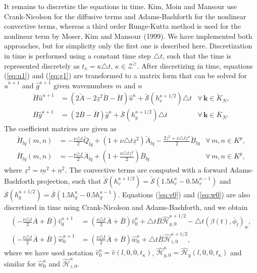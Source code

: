 \documentclass[11pt, oneside]{elsarticle}
\newcommand{\N}[1]{\check{#1}}
\newcommand{\D}[1]{\overline{#1}}
\begin{document}
It remains to discretize the equations in time. Kim, Moin and Mansour use 
Crank-Nicolson for the diffusive terms and Adams-Bashforth for the nonlinear 
convective terms, whereas a third order Runge-Kutta method is used for the 
nonlinear term by Moser, Kim and Mansour (1999). We have implemented both 
approaches, but for simplicity only the first one is described here. 
Discretization in time is performed using a constant time step $\triangle t$, 
such that the time is represented discretely as $t_{\kappa} = {\kappa} \triangle t, \, {\kappa} \in 
\mathcal{Z}^{\ge}$. After 
discretizing in time, equations (\ref{eq:u1}) and (\ref{eq:g1}) are transformed 
to a matrix form that can be solved for $\hat{u}^{{\kappa}+1}$ and $\hat{g}^{{\kappa}+1}$ 
given wavenumbers $m$ and $n$
\begin{align}
\N{H}\hat{u}^{{\kappa}+1} & = \left(2\N{A} - 2\underline{z}^2\N{B} - \N{H} 
\right)\hat{u}^{{\kappa}} + \N{\mathcal{S}}(h_v^{{\kappa}+1/2}) \triangle t & 
\forall \, {\bm{k}} \in \N{K}_N, 
\label{eq:ufin}\\ 
\D{H} \hat{g}^{{\kappa}+1} &= \left(2 \D{B}-\D{H}\right) 
\hat{g}^{{\kappa}} + \D{\mathcal{S}}(h_g^{{\kappa}+1/2}) \triangle t &\forall \, 
{\bm{k}} \in 
\D{K}_N. \label{eq:gfin}
\end{align}
The coefficient matrices are given as
\begin{align}
\N{H}_{lq}(m, n) &= -\frac{\nu \triangle t}{2}\N{Q}_{lq} + \left( 1 + \nu 
\triangle t 
\underline{z}^2 \right) \N{A}_{lq} - \frac{2\underline{z}^2 + \nu \triangle t 
\underline{z}^4}{2} \N{B}_{lq} &\forall \, m, n \in K^p, 
\label{eq:Biharmonic_matrix} \\
\D{H}_{lq}(m, n) &= -\frac{\nu \triangle 
t}{2}\D{A}_{lq} + (1 + \frac{\nu \triangle t \underline{z}^2}{2}) \D{B}_{lq} 
&\forall \, m, n \in K^p, \label{eq:Helmholtz_matrix}
\end{align}
where $\underline{z}^2 = \underline{m}^2 + \underline{n}^2$. The convective 
terms are computed with a forward Adams-Bashforth projection, such that 
$\N{\mathcal{S}}(h_v^{{\kappa}+1/2}) = 
\N{\mathcal{S}}(1.5h_v^{{\kappa}} - 0.5 h_v^{{\kappa}-1})$ and $\D{\mathcal{S}}(h_g^{{\kappa}+1/2}) 
= \D{\mathcal{S}}(1.5h_g^{{\kappa}} - 0.5 h_g^{{\kappa}-1})$. Equations 
(\ref{eq:v0}) and (\ref{eq:w0}) are also discretized in time using 
Crank-Nicolson and Adams-Bashforth, and we obtain
\begin{align}
\left(-\frac{\nu \triangle t}{2}\D{A} + \D{B} \right)\hat{v}_0^{{\kappa}+1} &= 
\left(\frac{\nu \triangle t}{2}\D{A} + \D{B} 
\right)\hat{v}^{{\kappa}}_0 + \triangle t\D{B}\hat{\mathcal{H}}_{y,0}^{{\kappa}+1/2} - \triangle t \left(\beta(t), \D{\phi}_l \right)_w , 
\label{eq:v00} \\
\left(-\frac{\nu \triangle t}{2}\D{A} + \D{B} \right)\hat{w}_0^{{\kappa}+1} &= 
\left(\frac{\nu \triangle t}{2}\D{A} + \D{B} 
\right)\hat{w}^{{\kappa}}_0 + \triangle t\D{B}\hat{\mathcal{H}}_{z,0}^{{\kappa}+1/2}, 
\label{eq:w00}
\end{align}
where we have used notation $\hat{v}^{{\kappa}}_0 = \hat{v}(l, 0, 0, t_{\kappa})$, 
$\hat{\mathcal{H}}^{{\kappa}}_{y,0} = \hat{\mathcal{H}}_y(l, 0, 0, t_{\kappa})$ and similar 
for $\hat{w}^{\kappa}_0$ and $\hat{\mathcal{H}}^{\kappa}_{z,0}$.
\end{document}
